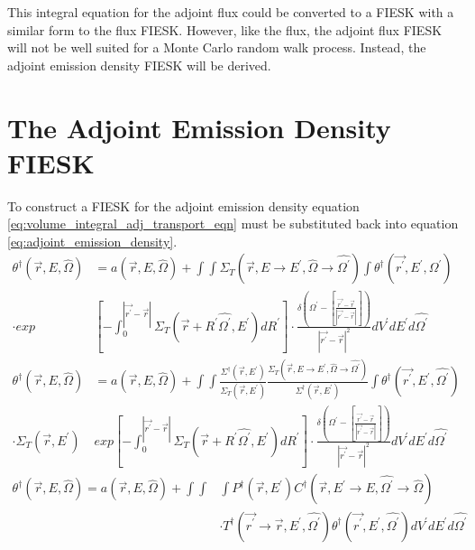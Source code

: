 This integral equation for the adjoint flux could be converted to a FIESK with
a similar form to the flux FIESK. However, like the flux, the adjoint flux
FIESK will not be well suited for a Monte Carlo random walk process. Instead,
the adjoint emission density FIESK will be derived.

\section{The Adjoint Emission Density FIESK}
To construct a FIESK for the adjoint emission density equation 
\ref{eq:volume_integral_adj_transport_eqn} must be substituted back into 
equation \ref{eq:adjoint_emission_density}. 
\begin{align}
  \theta^{\dagger}(\vec{r},E,\hat{\Omega}) & = a(\vec{r},E,\hat{\Omega}) +
  \int\int \Sigma_T(\vec{r},E \to E^{'},\hat{\Omega} \to \hat{\Omega^{'}})
  \int \theta^{\dagger}(\vec{r^{'}},E^{'},\hat{\Omega^{'}}) \nonumber \\
  \cdot exp&\left[-\int_0^{|\vec{r^{'}} - \vec{r}|} 
    \Sigma_T(\vec{r}+R^{'}\hat{\Omega^{'}},E^{'})dR^{'} \right]
  \cdot \frac{\delta \left(\Omega^{'} - \left[\frac{\vec{r^{'}} - \vec{r}}
      {|\vec{r^{'}} - \vec{r}|}\right]\right)}
        {|\vec{r^{'}} - \vec{r}|^2} dV^{'} dE^{'} d\hat{\Omega^{'}} \nonumber \\
        \theta^{\dagger}(\vec{r},E,\hat{\Omega}) & = a(\vec{r},E,\hat{\Omega}) +
        \int\int \frac{\Sigma^{\dagger}(\vec{r},E^{'})}{\Sigma_T(\vec{r},E^{'})}
        \frac{\Sigma_T(\vec{r},E \to E^{'},\hat{\Omega} \to \hat{\Omega^{'}})}
             {\Sigma^{\dagger}(\vec{r},E^{'})}
  \int \theta^{\dagger}(\vec{r^{'}},E^{'},\hat{\Omega^{'}}) \nonumber \\
  \cdot \Sigma_T(\vec{r},E^{'}) &exp\left[-\int_0^{|\vec{r^{'}} - \vec{r}|} 
    \Sigma_T(\vec{r}+R^{'}\hat{\Omega^{'}},E^{'})dR^{'} \right]
  \cdot \frac{\delta \left(\Omega^{'} - \left[\frac{\vec{r^{'}} - \vec{r}}
      {|\vec{r^{'}} - \vec{r}|}\right]\right)}
        {|\vec{r^{'}} - \vec{r}|^2} dV^{'} dE^{'} d\hat{\Omega^{'}} \nonumber
\end{align}
\begin{equation}
  \begin{split}
    \theta^{\dagger}(\vec{r},E,\hat{\Omega}) = a(\vec{r},E,\hat{\Omega}) + 
    \int\int&\int P^{\dagger}(\vec{r},E^{'})
    C^{\dagger}(\vec{r},E^{'} \to E,\hat{\Omega^{'}} \to \hat{\Omega}) \\
    & \cdot T^{\dagger}(\vec{r^{'}} \to \vec{r},E^{'},\hat{\Omega^{'}})
    \theta^{\dagger}(\vec{r^{'}},E^{'},\hat{\Omega^{'}})
    dV^{'} dE^{'} d\hat{\Omega^{'}}
  \end{split}
  \label{eq:adj_emission_dens_int_eqn}
\end{equation}

